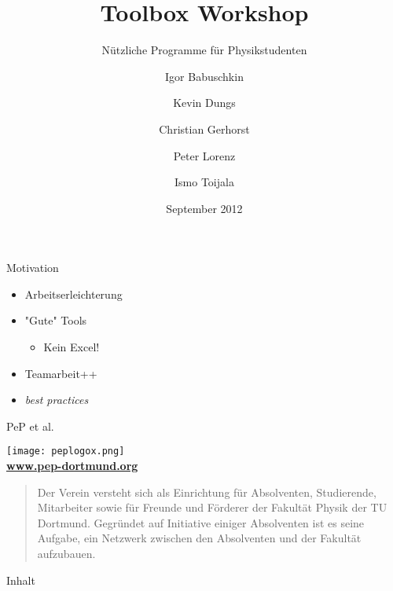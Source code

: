 \documentclass[t]{beamer}
\title{Toolbox Workshop}
\subtitle{Nützliche Programme für Physikstudenten}
\author[Igor B.\and Kevin D.\and Christian G.\and Peter L.\and Ismo T.]{
       Igor Babuschkin%
  \and Kevin Dungs%
  \and Christian Gerhorst%
  \and Peter Lorenz%
  \and Ismo Toijala%
}
\institute[PeP et al. e.V.]{PeP et al. e.V.\thanks{\href{http://pep-dortmund.org}{pep-dortmund.org}}}
\date{September 2012}
\begin{document}
  {
    \begin{frame}
      \titlepage
    \end{frame}
  }

  \begin{frame}{Motivation}
    \begin{itemize}
      \item Arbeitserleichterung
      \item "Gute" Tools \begin{itemize}
        \item Kein Excel!
      \end{itemize}
    \item Teamarbeit++
    \item \textit{best practices}
    \end{itemize}  
  \end{frame}

  \begin{frame}{PeP et al.}
    \begin{center}
      \texttt{[image: peplogox.png]} \\
      \color{TUgreen}\textbf{\href{http://pep-dortmund.org}{www.pep-dortmund.org}}
    \end{center}
    \begin{quote}
      \begin{spacing}{1.0}
        Der Verein versteht sich als Einrichtung für Absolventen, Studierende, Mitarbeiter sowie für Freunde und Förderer der Fakultät Physik der TU Dortmund. Gegründet auf Initiative einiger Absolventen ist es seine Aufgabe, ein Netzwerk zwischen den Absolventen und der Fakultät aufzubauen.
      \end{spacing}
    \end{quote}
  \end{frame}
  

  \begin{frame}{Inhalt}
    \tableofcontents[subsectionstyle=hide]
  \end{frame}

  
  
  
\end{document}
